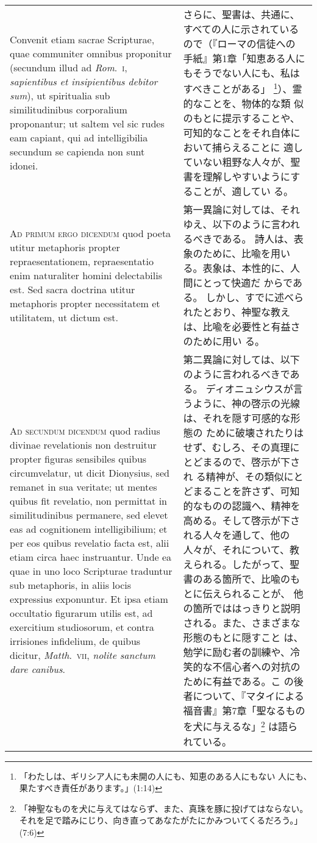 \documentclass[10pt]{jsarticle} %
\begin{document}
\begin{longtable}{p{21em}p{21em}}
 Convenit etiam
sacrae Scripturae, quae communiter omnibus proponitur (secundum illud ad
{\itshape Rom}.~{\scshape i}, {\itshape sapientibus et insipientibus debitor sum}), ut spiritualia sub
similitudinibus corporalium proponantur; ut saltem vel sic rudes eam
capiant, qui ad intelligibilia secundum se capienda non sunt idonei.


&


さらに、聖書は、共通に、すべての人に示されているので（『ローマの信徒への
 手紙』第1章「知恵ある人にもそうでない人にも、私はすべきことがある」
 \footnote{「わたしは、ギリシア人にも未開の人にも、知恵のある人にもない
 人にも、果たすべき責任があります。」(1:14)}）、霊的なことを、物体的な類
 似のもとに提示することや、可知的なことをそれ自体において捕らえることに
 適していない粗野な人々が、聖書を理解しやすいようにすることが、適してい
 る。


\\


{\scshape Ad primum ergo dicendum} quod poeta utitur
metaphoris propter repraesentationem, repraesentatio enim naturaliter
homini delectabilis est. Sed sacra doctrina utitur metaphoris propter
necessitatem et utilitatem, ut dictum est.


&

第一異論に対しては、それゆえ、以下のように言われるべきである。
詩人は、表象のために、比喩を用いる。表象は、本性的に、人間にとって快適だ
 からである。
しかし、すでに述べられたとおり、神聖な教えは、比喩を必要性と有益さのために用い
 る。


\\


{\scshape Ad secundum dicendum} quod radius divinae
revelationis non destruitur propter figuras sensibiles quibus
circumvelatur, ut dicit Dionysius, sed remanet in sua veritate; ut
mentes quibus fit revelatio, non permittat in similitudinibus permanere,
sed elevet eas ad cognitionem intelligibilium; et per eos quibus
revelatio facta est, alii etiam circa haec instruantur. Unde ea quae in
uno loco Scripturae traduntur sub metaphoris, in aliis locis expressius
exponuntur. Et ipsa etiam occultatio figurarum utilis est, ad exercitium
studiosorum, et contra irrisiones infidelium, de quibus dicitur,
{\itshape Matth}.~{\scshape vii}, {\itshape nolite sanctum dare canibus}.


&

第二異論に対しては、以下のように言われるべきである。
ディオニュシウスが言うように、神の啓示の光線は、それを隠す可感的な形態の
 ために破壊されたりはせず、むしろ、その真理にとどまるので、啓示が下され
 る精神が、その類似にとどまることを許さず、可知的なものの認識へ、精神を
 高める。そして啓示が下される人々を通して、他の人々が、それについて、教
 えられる。したがって、聖書のある箇所で、比喩のもとに伝えられることが、
 他の箇所でははっきりと説明される。また、さまざまな形態のもとに隠すこと
 は、勉学に励む者の訓練や、冷笑的な不信心者への対抗のために有益である。こ
 の後者について、『マタイによる福音書』第7章「聖なるものを犬に与えるな」\footnote{「神聖なものを犬に与えてはならず、また、真珠を豚に投げてはならない。それを足で踏みにじり、向き直ってあなたがたにかみついてくるだろう。」(7:6)}
 は語られている。


\end{longtable}
\end{document}
